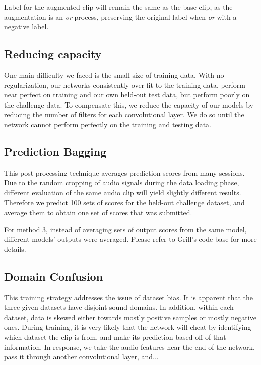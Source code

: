 \documentclass[10pt,twocolumn,letterpaper]{article}
\begin{document}
Label for the augmented clip will remain the same as the base clip, as the
augmentation is an \textit{or} process, preserving the original label when 
\textit{or} with a negative label.

\subsection{Reducing capacity}

One main difficulty we faced is the small size of training data. With no
regularization, our networks consistently over-fit to the training data,
perform near perfect on training and our own held-out test data, but
perform poorly on the challenge data. To compensate this, we reduce the
capacity of our models by reducing the number of filters for each
convolutional layer. We do so until the network cannot perform perfectly on
the training and testing data.

\subsection{Prediction Bagging}

This post-processing technique averages prediction scores from many
sessions. Due to the random cropping of audio signals during the data
loading phase, different evaluation of the same audio clip will yield
slightly different results. Therefore we predict 100 sets of scores for the
held-out challenge dataset, and average them to obtain one set of scores
that was submitted.

For method 3, instead of averaging sets of output scores from the same
model, different models' outputs were averaged. Please refer to Grill's
code base for more details.

\subsection{Domain Confusion}


This training strategy addresses the issue of dataset bias. It is apparent
that the three given datasets have disjoint sound domains. In addition,
within each dataset, data is skewed either towards mostly positive samples
or mostly negative ones. During training, it is very likely that the
network will cheat by identifying which dataset the clip is from, and make
its prediction based off of that information. In response, we take the
audio features near the end of the network, pass it through another
convolutional layer, and... 
\end{document}
